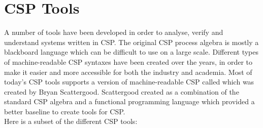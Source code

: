 \section{CSP Tools}
A number of tools have been developed in order to analyse, verify and understand systems written in CSP. The original CSP process algebra is mostly a blackboard language which can be difficult to use on a large scale. Different types of machine-readable CSP syntaxes have been created over the years, in order to make it easier and more accessible for both the industry and academia. Most of today's CSP tools supports a version of machine-readable CSP called \cspm{} which was created by Bryan Scattergood\cite{Scattergood1998}. Scattergood created \cspm{} as a combination of the standard CSP algebra and a functional programming language which provided a better baseline to create tools for CSP.\\
Here is a subset of the different CSP tools:
